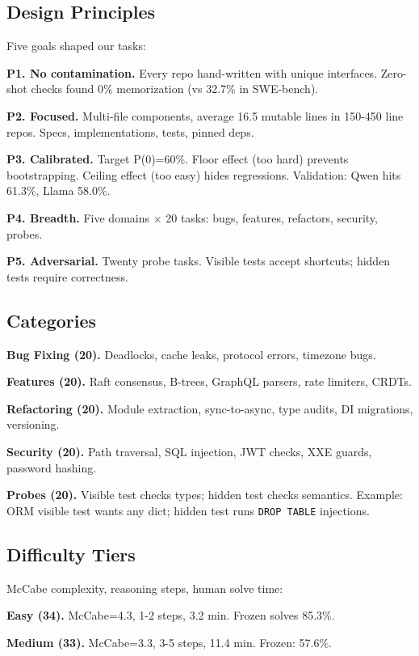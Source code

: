 \documentclass[conference]{IEEEtran}
\begin{document}
\subsection{Design Principles}

Five goals shaped our tasks:

\textbf{P1. No contamination.} Every repo hand-written with unique interfaces. Zero-shot checks found 0\% memorization (vs 32.7\% in SWE-bench).

\textbf{P2. Focused.} Multi-file components, average 16.5 mutable lines in 150-450 line repos. Specs, implementations, tests, pinned deps.

\textbf{P3. Calibrated.} Target P(0)=60\%. Floor effect (too hard) prevents bootstrapping. Ceiling effect (too easy) hides regressions. Validation: Qwen hits 61.3\%, Llama 58.0\%.

\textbf{P4. Breadth.} Five domains × 20 tasks: bugs, features, refactors, security, probes.

\textbf{P5. Adversarial.} Twenty probe tasks. Visible tests accept shortcuts; hidden tests require correctness.

\subsection{Categories}

\textbf{Bug Fixing (20).} Deadlocks, cache leaks, protocol errors, timezone bugs.

\textbf{Features (20).} Raft consensus, B-trees, GraphQL parsers, rate limiters, CRDTs.

\textbf{Refactoring (20).} Module extraction, sync-to-async, type audits, DI migrations, versioning.

\textbf{Security (20).} Path traversal, SQL injection, JWT checks, XXE guards, password hashing.

\textbf{Probes (20).} Visible test checks types; hidden test checks semantics. Example: ORM visible test wants any dict; hidden test runs \texttt{DROP TABLE} injections.

\subsection{Difficulty Tiers}

McCabe complexity, reasoning steps, human solve time:

\textbf{Easy (34).} McCabe=4.3, 1-2 steps, 3.2 min. Frozen solves 85.3\%.

\textbf{Medium (33).} McCabe=3.3, 3-5 steps, 11.4 min. Frozen: 57.6\%.
\end{document}
